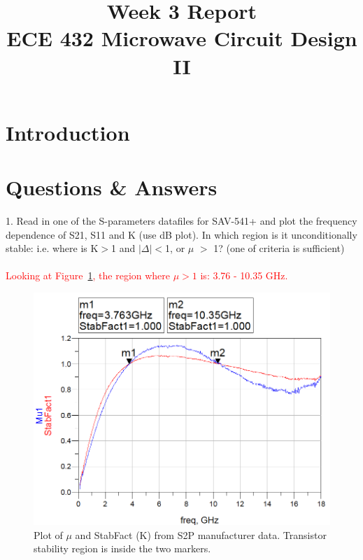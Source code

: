 \documentclass[conference]{IEEEtran}
\begin{document}
\title{Week 3 Report\\ECE 432 Microwave Circuit Design II}
\author{
}
\maketitle
\IEEEpeerreviewmaketitle
\section{Introduction}

\section{Questions \& Answers}
1. Read in one of the S-parameters datafiles for SAV-541+ and plot the frequency dependence of S21, S11 and K (use dB plot). In which region is it unconditionally stable: i.e. where is K$>$1 and $|\Delta|<$1, or $\mu$ $>$ 1? (one of criteria is sufficient)\\\\
\textcolor{red}{Looking at Figure~\ref{fig:stable}, the region where $\mu>1$ is: 3.76 - 10.35 GHz.}

\begin{figure}[!h]
\centering
\includegraphics[scale=0.35]{pic/1stable.png}
\caption{Plot of $\mu$ and StabFact (K) from S2P manufacturer data.  Transistor stability region is inside the two markers.}
\label{fig:stable}
\end{figure}
\end{document}
